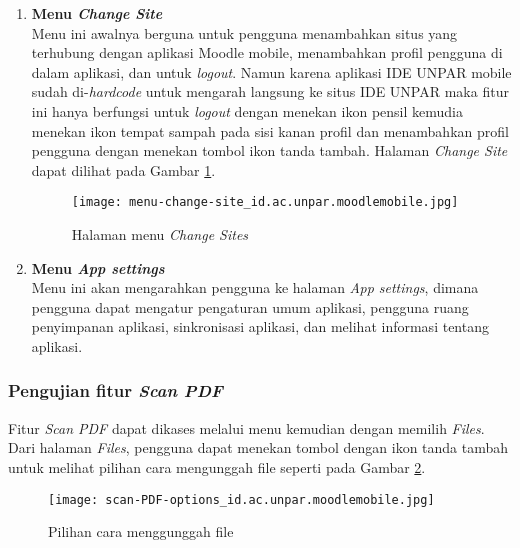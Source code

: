 \begin{enumerate}
\item \textbf{Menu \textit{Change Site}} \\
Menu ini awalnya berguna untuk pengguna menambahkan situs yang terhubung dengan aplikasi Moodle mobile, menambahkan profil pengguna di dalam aplikasi, dan untuk \textit{logout}. Namun karena aplikasi IDE UNPAR mobile sudah di-\textit{hardcode} untuk mengarah langsung ke situs IDE UNPAR maka fitur ini hanya berfungsi untuk \textit{logout} dengan menekan ikon pensil kemudia menekan ikon tempat sampah pada sisi kanan profil dan menambahkan profil pengguna dengan menekan tombol ikon tanda tambah. Halaman \textit{Change Site} dapat dilihat pada Gambar \ref{app:menu:change:sites}.

\begin{figure}[H] 
	\centering  
	\texttt{[image: menu-change-site\_id.ac.unpar.moodlemobile.jpg]}  
	\caption[Halaman menu \textit{Change Sites}] {Halaman menu \textit{Change Sites}} 
	\label{app:menu:change:sites} 
\end{figure}  

\item \textbf{Menu \textit{App settings}} \\
Menu ini akan mengarahkan pengguna ke halaman \textit{App settings}, dimana pengguna dapat mengatur pengaturan umum aplikasi, pengguna ruang penyimpanan aplikasi, sinkronisasi aplikasi, dan melihat informasi tentang aplikasi.
\end{enumerate}


\subsubsection{Pengujian fitur \textit{Scan PDF}}

Fitur \textit{Scan PDF} dapat dikases melalui menu kemudian dengan memilih \textit{Files}. Dari halaman \textit{Files}, pengguna dapat menekan tombol dengan ikon tanda tambah untuk melihat pilihan cara mengunggah file seperti pada Gambar \ref{app:menu:files:options}. 

\begin{figure}[H] 
	\centering  
	\texttt{[image: scan-PDF-options\_id.ac.unpar.moodlemobile.jpg]}  
	\caption[Pilihan cara menggunggah file] {Pilihan cara menggunggah file} 
	\label{app:menu:files:options} 
\end{figure}  

